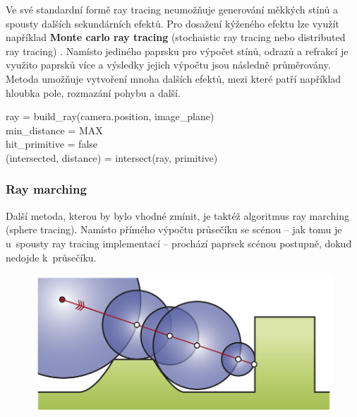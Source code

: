 Ve své standardní formě ray tracing neumožňuje generování měkkých stínů a spousty dalších sekundárních efektů.  Pro dosažení kýženého efektu lze využít například \textbf{Monte carlo ray tracing} (stochaistic ray tracing nebo distributed ray tracing) \cite{distributed_rt}. Namísto jediného paprsku pro výpočet stínů, odrazů a refrakcí je využito paprsků více a výsledky jejich výpočtu jsou následně průměrovány. Metoda umožňuje vytvoření mnoha dalších efektů, mezi které patří například hloubka pole, rozmazání pohybu a další.

\begin{center}
	\begin{czechalgorithm}[H] \label{alg:rt_1}
		ray = build\_ray(camera.position, image\_plane)\\
		min\_distance = MAX\\
		hit\_primitive = false\\
		 {
			(intersected, distance) = intersect(ray, primitive)\\
		}
		\caption{Ray tracing}
	\end{czechalgorithm}
\end{center}

\subsubsection{Ray marching}
Další metoda, kterou by bylo vhodné zmínit, je taktéž algoritmus ray marching (sphere tracing). Namísto přímého výpočtu průsečíku se scénou -- jak tomu je u~spousty ray tracing implementací -- prochází paprsek scénou postupně, dokud nedojde k~průsečíku.

\begin{figure}[H]
	\centering
	\captionsetup{justification=centering}
	\includegraphics[scale=0.8]{obrazky-figures/ray_marching.png}
	\label{fig:ray_marching}
\end{figure}

